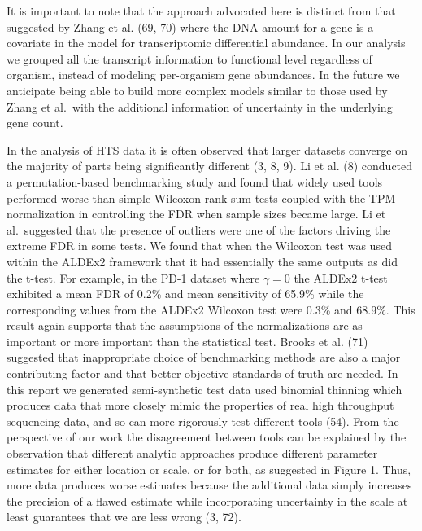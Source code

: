 \documentclass[
]{article}
\begin{document}
It is important to note that the approach advocated here is distinct
from that suggested by Zhang et al. (69, 70) where the DNA amount for a
gene is a covariate in the model for transcriptomic differential
abundance. In our analysis we grouped all the transcript information to
functional level regardless of organism, instead of modeling
per-organism gene abundances. In the future we anticipate being able to
build more complex models similar to those used by Zhang et al.~with the
additional information of uncertainty in the underlying gene count.

In the analysis of HTS data it is often observed that larger datasets
converge on the majority of parts being significantly different (3, 8,
9). Li et al. (8) conducted a permutation-based benchmarking study and
found that widely used tools performed worse than simple Wilcoxon
rank-sum tests coupled with the TPM normalization in controlling the FDR
when sample sizes became large. Li et al.~suggested that the presence of
outliers were one of the factors driving the extreme FDR in some tests.
We found that when the Wilcoxon test was used within the ALDEx2
framework that it had essentially the same outputs as did the t-test.
For example, in the PD-1 dataset where \(\gamma = 0\) the ALDEx2 t-test
exhibited a mean FDR of 0.2\% and mean sensitivity of 65.9\% while the
corresponding values from the ALDEx2 Wilcoxon test were 0.3\% and
68.9\%. This result again supports that the assumptions of the
normalizations are as important or more important than the statistical
test. Brooks et al. (71) suggested that inappropriate choice of
benchmarking methods are also a major contributing factor and that
better objective standards of truth are needed. In this report we
generated semi-synthetic test data used binomial thinning which produces
data that more closely mimic the properties of real high throughput
sequencing data, and so can more rigorously test different tools (54).
From the perspective of our work the disagreement between tools can be
explained by the observation that different analytic approaches produce
different parameter estimates for either location or scale, or for both,
as suggested in Figure 1. Thus, more data produces worse estimates
because the additional data simply increases the precision of a flawed
estimate while incorporating uncertainty in the scale at least
guarantees that we are less wrong (3, 72).
\end{document}
